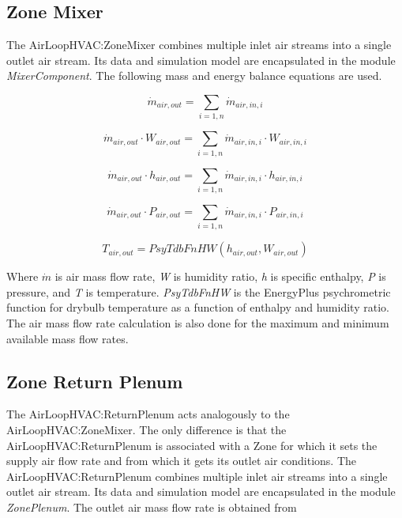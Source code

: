 \subsection{Zone Mixer}\label{zone-mixer}

The AirLoopHVAC:ZoneMixer combines multiple inlet air streams into a single outlet air stream. Its data and simulation model are encapsulated in the module \emph{MixerComponent}. The following mass and energy balance equations are used.

\begin{equation}
{\dot m_{air,out}} = \sum\limits_{i = 1,n} {{{\dot m}_{air,in,i}}}
\end{equation}

\begin{equation}
{\dot m_{air,out}}\cdot {W_{air,out}} = \sum\limits_{i = 1,n} {{{\dot m}_{air,in,i}}} \cdot {W_{air,in,i}}
\end{equation}

\begin{equation}
{\dot m_{air,out}}\cdot {h_{air,out}} = \sum\limits_{i = 1,n} {{{\dot m}_{air,in,i}}} \cdot {h_{air,in,i}}
\end{equation}

\begin{equation}
{\dot m_{air,out}}\cdot {P_{air,out}} = \sum\limits_{i = 1,n} {{{\dot m}_{air,in,i}}} \cdot {P_{air,in,i}}
\end{equation}

\begin{equation}
{T_{air,out}} = PsyTdbFnHW({h_{air,out}},{W_{air,out}})
\end{equation}

Where \(\dot m\) is air mass flow rate, \emph{W} is humidity ratio, \emph{h} is specific enthalpy, \emph{P} is pressure, and \emph{T} is temperature. \emph{PsyTdbFnHW} is the EnergyPlus psychrometric function for drybulb temperature as a function of enthalpy and humidity ratio. The air mass flow rate calculation is also done for the maximum and minimum available mass flow rates.

\subsection{Zone Return Plenum}\label{zone-return-plenum}

The AirLoopHVAC:ReturnPlenum acts analogously to the AirLoopHVAC:ZoneMixer. The only difference is that the AirLoopHVAC:ReturnPlenum is associated with a Zone for which it sets the supply air flow rate and from which it gets its outlet air conditions. The AirLoopHVAC:ReturnPlenum combines multiple inlet air streams into a single outlet air stream. Its data and simulation model are encapsulated in the module \emph{ZonePlenum}. The outlet air mass flow rate is obtained from


